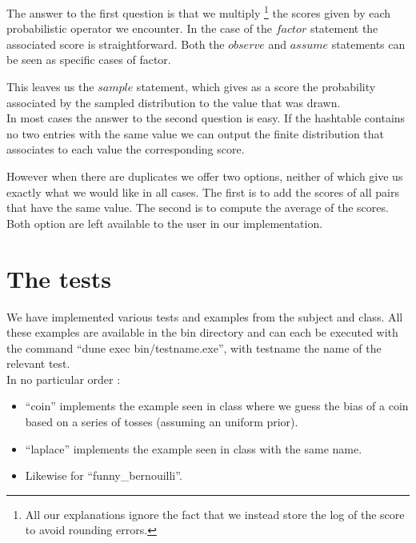 \documentclass{article}
\begin{document}
	The answer to the first question is that we multiply 
	\footnote{All our explanations ignore the fact that we instead store the log of the score to avoid rounding errors.}
	the scores given by each probabilistic operator we encounter.
	In the case of the $factor$ statement the associated score is straightforward. 
	Both the $observe$ and $assume$ statements can be seen as specific cases of factor.

	This leaves us the $sample$ statement, which gives as a score the probability associated by the sampled distribution to the value that was drawn. \\

	In most cases the answer to the second question is easy. 
	If the hashtable contains no two entries with the same value we can output the finite distribution that associates to each value the corresponding score.

	However when there are duplicates we offer two options, neither of which give us exactly what we would like in all cases.
	The first is to add the scores of all pairs that have the same value.
	The second is to compute the average of the scores.
	Both option are left available to the user in our implementation. \\

\section{The tests}

	We have implemented various tests and examples from the subject and class.
	All these examples are available in the bin directory and can each be executed with the command ``dune exec bin/testname.exe'', with testname the name of the relevant test. \\

	In no particular order : 

	\begin{itemize}
	  \item ``coin'' implements the example seen in class where we guess the bias of a coin based on a series of tosses (assuming an uniform prior).
	  \item ``laplace'' implements the example seen in class with the same name.
	  \item Likewise for ``funny\_bernouilli''.
	\end{itemize}
	
\end{document}
